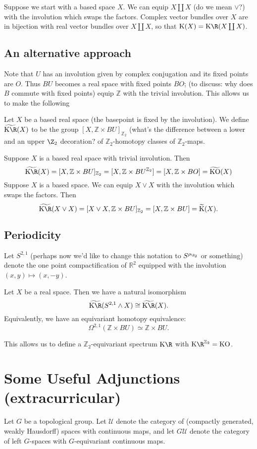 \documentclass[11pt]{article}
\newcommand{\rednote}[1]{{\color{red}#1}\scalebox{.1}{rednote}}
\newcommand{\bluenote}[1]{{\color{blue}#1}\scalebox{.1}{rednote}}
\newcommand{\Extracurricular}[1]{
\section*{#1 {\small(extracurricular)}}
}
\begin{document}
Suppose we start with a based space $X$. We can equip $X\coprod X$ \rednote{(do we mean $\vee$?)} with the involution which swaps the factors. Complex vector bundles over $X$ are in bijection with real vector bundles over $X\coprod X$, so that $\K(X)=\KR(X\coprod X)$.
\subsection*{An alternative approach}
Note that $U$ has an involution given by complex conjugation and its fixed points are $O$. Thus $BU$ becomes a real space with fixed points $BO$; \bluenote{(to discuss: why does $B$ commute with fixed points)} equip $\mathbb{Z}$ with the trivial involution. This allows us to make the following
\begin{defn*} Let $X$ be a based real space (the basepoint is fixed by the involution). We define $\widetilde{\KR}(X)$ to be the group $[X,\mathbb{Z}\times BU]_{\mathbb{Z}_2}$ \rednote{(what's the difference between a lower and an upper $\Z_2$ decoration?} of $\mathbb{Z}_2$-homotopy classes of $\mathbb{Z}_2$-maps.
\end{defn*}
Suppose $X$ is a based real space with trivial involution. Then \[\widetilde{\KR}(X)=[X,\mathbb{Z}\times BU]_{\mathbb{Z}_2}=[X,\mathbb{Z}\times BU^{\mathbb{Z}_2}]=[X,\mathbb{Z}\times BO]=\widetilde{\KO}(X)\]
Suppose $X$ is a based space. We can equip $X\vee X$ with the involution which swaps the factors. Then \[\widetilde{\KR}(X\vee X)=[X\vee X,\mathbb{Z}\times BU]_{\mathbb{Z}_2}=[X,\mathbb{Z}\times BU]=\widetilde{\K}(X).\]
\subsection*{Periodicity}
Let $S^{2,1}$ \bluenote{(perhaps now we'd like to change this notation to $S^{\rho_{\Z_2}}$ or something)} denote the one point compactification of $\mathbb{R}^2$ equipped with the involution $(x,y)\mapsto (x,-y)$.

\begin{thm*}
Let $X$ be a real space. Then we have a natural isomorphism
\[\widetilde{\KR}(S^{2,1}\wedge X)\cong\widetilde{\KR}(X).\] Equivalently, we have an equivariant homotopy equivalence:
\[\Omega^{2,1}(\mathbb{Z}\times BU)\simeq\mathbb{Z}\times BU.\]
\end{thm*}
\noindent This allows us to define a $\mathbb{Z}_2$-equivariant spectrum $\KR$ with $\KR^{\mathbb{Z}_2}=\KO$.

\Extracurricular{Some Useful Adjunctions}
Let $G$ be a topological group.
Let $\mathscr{U}$ denote the category of (compactly generated, weakly Hausdorff) spaces with continuous maps, and let $G\mathscr{U}$ denote the category of left $G$-spaces with $G$-equivariant continuous maps.
\end{document}
